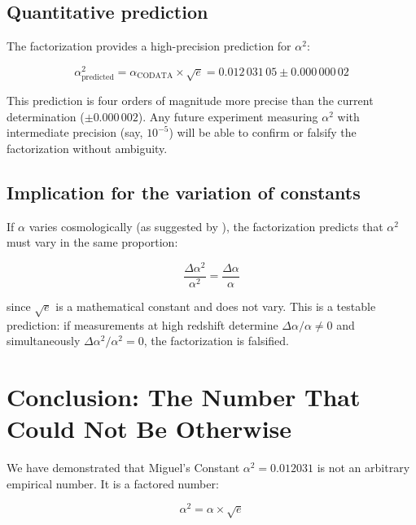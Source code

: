 \documentclass[12pt,a4paper,twoside]{article}
\newcommand{\alphaii}{\alpha^{2}}
\begin{document}
\subsection{Quantitative prediction}

The factorization provides a high-precision prediction for $\alphaii$:

\begin{equation}
\alphaii_{\text{predicted}} = \alpha_{\text{CODATA}} \times \sqrt{e} = 0.012\,031\,05 \pm 0.000\,000\,02
\end{equation}

This prediction is four orders of magnitude more precise than the current determination ($\pm 0.000\,002$). Any future experiment measuring $\alphaii$ with intermediate precision (say, $10^{-5}$) will be able to confirm or falsify the factorization without ambiguity.

\subsection{Implication for the variation of constants}

If $\alpha$ varies cosmologically (as suggested by \cite{Webb2001}), the factorization predicts that $\alphaii$ must vary in the same proportion:

\begin{equation}
\frac{\Delta\alphaii}{\alphaii} = \frac{\Delta\alpha}{\alpha}
\label{eq:variacao}
\end{equation}

\noindent since $\sqrt{e}$ is a mathematical constant and does not vary. This is a testable prediction: if measurements at high redshift determine $\Delta\alpha/\alpha \neq 0$ and simultaneously $\Delta\alphaii/\alphaii = 0$, the factorization is falsified.



\section{Conclusion: The Number That Could Not Be Otherwise}
\label{sec:conclusao}

We have demonstrated that Miguel's Constant $\alphaii = 0.012031$ is not an arbitrary empirical number. It is a factored number:

\begin{equation*}
\alphaii = \alpha \times \sqrt{e}
\end{equation*}
\end{document}
